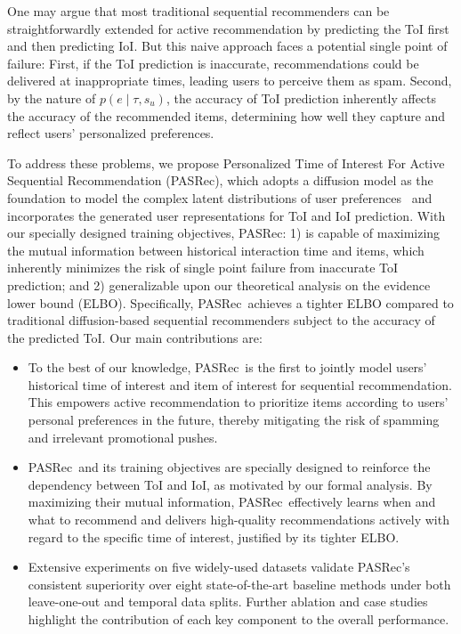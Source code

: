 \documentclass[sigconf,nonacm]{acmart}
\newcommand{\modelname}{PASRec}
\begin{document}
One may argue that most traditional sequential recommenders can be straightforwardly extended for active recommendation by predicting the ToI first and then predicting IoI. But this naive approach faces a potential single point of failure: First, if the ToI prediction is inaccurate, recommendations could be delivered at inappropriate times, leading users to perceive them as spam. Second, by the nature of \( p(e \mid \tau, {s}_u) \), the accuracy of ToI prediction inherently affects the accuracy of the recommended items, determining how well they capture and reflect users' personalized preferences.

To address these problems, we propose Personalized Time of Interest For Active Sequential Recommendation (\modelname), which adopts a diffusion model as the foundation to model the complex latent distributions of user preferences~\cite{lin2024survey} and incorporates the generated user representations for ToI and IoI prediction. 
With our specially designed training objectives, \modelname: 1) is capable of maximizing the mutual information between historical interaction time and items, which inherently minimizes the risk of single point failure from inaccurate ToI prediction; and 2) generalizable upon our theoretical analysis on the evidence lower bound (ELBO). Specifically, \modelname\ achieves a tighter ELBO compared to traditional diffusion-based sequential recommenders subject to the accuracy of the predicted ToI. 
Our main contributions are:
\begin{itemize}[leftmargin=*,itemsep=0.5pt,topsep=2.5pt]
    \item To the best of our knowledge, \modelname\ is the first to jointly model users' historical time of interest and item of interest for sequential recommendation. This empowers active recommendation to prioritize items according to users' personal preferences in the future, thereby mitigating the risk of spamming and irrelevant promotional pushes.

    \item \modelname\ and its training objectives are specially designed to reinforce the dependency between ToI and IoI, as motivated by our formal analysis. By maximizing their mutual information, \modelname\ effectively learns when and what to recommend and delivers high-quality recommendations actively with regard to the specific time of interest, justified by its tighter ELBO. 
    
    \item Extensive experiments on five widely-used datasets validate \modelname's consistent superiority over eight state-of-the-art baseline methods under both leave-one-out and temporal data splits. Further ablation and case studies highlight the contribution of each key component to the overall performance.
\end{itemize}
\end{document}
